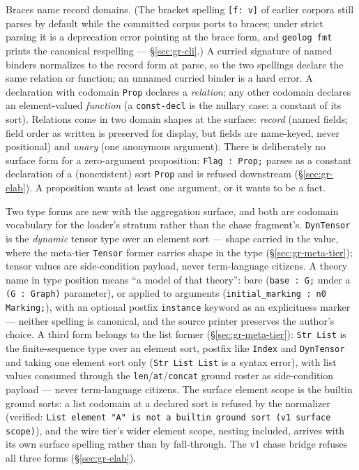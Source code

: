 \noindent Braces name record domains. (The bracket spelling
\texttt{[f:\,v]} of earlier corpora still parses by default while
the committed corpus ports to braces; under strict parsing it is a
deprecation error pointing at the brace form, and \texttt{geolog
fmt} prints the canonical respelling --- \S\ref{sec:gr-cli}.) A
curried signature of named binders normalizes to the record form at
parse, so the two spellings declare the same relation or function;
an unnamed curried binder is a hard error. A declaration with
codomain \texttt{Prop} declares a
\emph{relation}; any other codomain declares an element-valued
\emph{function} (a \texttt{const-decl} is the nullary case: a
constant of its sort). Relations come in two domain shapes at the
surface: \emph{record} (named fields; field order as written is
preserved for display, but fields are name-keyed, never positional)
and \emph{unary} (one anonymous argument). There is deliberately no
surface form for a zero-argument proposition: \texttt{Flag : Prop;}
parses as a constant declaration of a (nonexistent) sort
\texttt{Prop} and is refused downstream (\S\ref{sec:gr-elab}). A
proposition wants at least one argument, or it wants to be a fact.

Two type forms are new with the aggregation surface, and both are
codomain vocabulary for the loader's stratum rather than the chase
fragment's. \texttt{DynTensor} is the \emph{dynamic} tensor type
over an element sort — shape carried in the value, where the
meta-tier \texttt{Tensor} former carries shape in the type
(\S\ref{sec:gr-meta-tier}); tensor values are side-condition
payload, never term-language citizens. A theory name in type
position means ``a model of that theory'': bare (\texttt{base :
G;} under a \texttt{(G : Graph)} parameter), or applied to
arguments (\texttt{initial\_marking : n0 Marking;}), with an
optional postfix \texttt{instance} keyword as an explicitness
marker — neither spelling is canonical, and the source printer
preserves the author's choice. A third form belongs to
the list former (\S\ref{sec:gr-meta-tier}): \texttt{Str List} is the
finite-sequence type over an element sort, postfix like
\texttt{Index} and \texttt{DynTensor} and taking one element sort
only (\texttt{Str List List} is a syntax error), with list values
consumed through the \texttt{len}/\texttt{at}/\texttt{concat} ground
roster as side-condition payload — never term-language citizens. The
surface element scope is the builtin ground sorts: a list codomain
at a declared sort is refused by the normalizer (verified:
\texttt{List element "A" is not a builtin ground sort (v1 surface
scope)}), and the wire tier's wider element scope, nesting included,
arrives with its own surface spelling rather than by fall-through.
The v1 chase bridge refuses all three forms (\S\ref{sec:gr-elab}).

